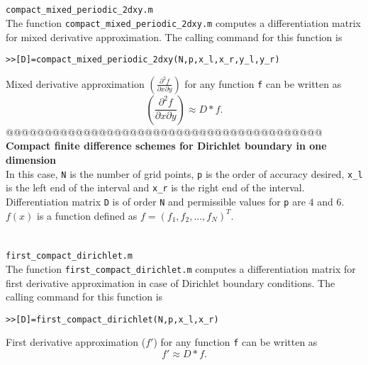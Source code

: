 \documentclass[acmtoms]{acmtrans2m}
\begin{document}
\section{} \verb#compact_mixed_periodic_2dxy.m#\\
 The function \verb#compact_mixed_periodic_2dxy.m# computes a differentiation matrix for mixed derivative approximation. The calling command for this function is
\begin{alltt}
>>[D]=compact_mixed_periodic_2dxy(N,p,x_l,x_r,y_l,y_r)
\end{alltt}
 Mixed derivative approximation $\left(\frac{\partial^2 f}{\partial x \partial y}\right)$ for any function \verb#f# can be written as
\[
\left(\frac{\partial^2 f}{\partial x \partial y}\right)\approx D*f.
\]
@@@@@@@@@@@@@@@@@@@@@@@@@@@@@@@@@@@@@@@@@\\
\textbf{Compact finite difference schemes for Dirichlet boundary in one dimension}\\
 In this case, \verb#N# is the number of grid points, \verb#p# is the order of accuracy desired, \verb#x_l# is the left end of the interval and \verb#x_r# is the right end of the interval. Differentiation matrix \verb#D# is of order \verb#N# and permissible values for \verb#p# are $4$ and $6$. $f(x)$ is a function defined as $f=(f_{1},f_{2},...,f_{N})^T$.
\section{} \verb#first_compact_dirichlet.m#\\
 The function \verb#first_compact_dirichlet.m# computes a differentiation matrix for first derivative approximation in case of Dirichlet boundary conditions. The calling command for this function is
\begin{alltt}
>>[D]=first_compact_dirichlet(N,p,x_l,x_r)
\end{alltt}
First derivative approximation ($f'$) for any function \verb#f# can be written as
\[
f'\approx D*f.
\]
\end{document}
